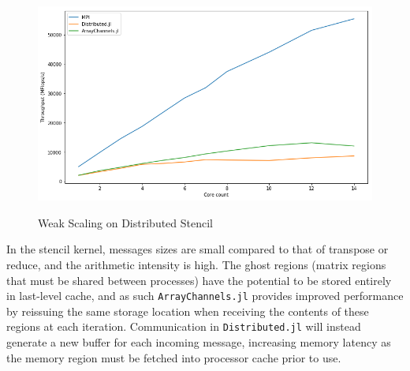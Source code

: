 \begin{figure}[htb]
  \includegraphics[width=\linewidth]{figs/stencil.png}
  \label{fig:stencil-results}
  \caption{Weak Scaling on Distributed Stencil}
\end{figure}

In the stencil kernel, messages sizes are small compared to that of
transpose or reduce, and the arithmetic intensity is high. The ghost
regions (matrix regions that must be shared between processes) have the
potential to be stored entirely in last-level cache, and as such
\texttt{ArrayChannels.jl} provides improved performance by reissuing the
same storage location when receiving the contents of these regions at
each iteration. Communication in \texttt{Distributed.jl} will instead
generate a new buffer for each incoming message, increasing memory
latency as the memory region must be fetched into processor cache prior
to use.
